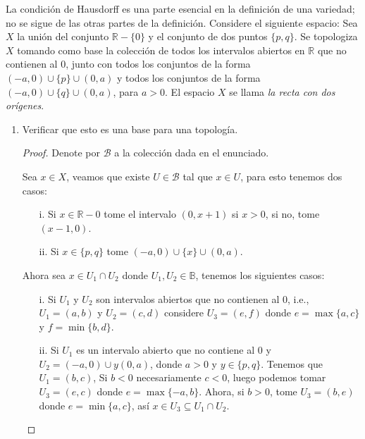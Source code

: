 
\item La condición de Hausdorff es una parte esencial en la definición de una variedad; no se sigue de las otras partes de la definición. Considere el siguiente espacio:  
    Sea \( X \) la unión del conjunto \( \mathbb{R} - \{ 0 \} \) y el conjunto de dos puntos \( \{ p, q \} \). Se topologiza \( X \) tomando como base la colección de todos los intervalos abiertos en \( \mathbb{R} \) que no contienen al \( 0 \), junto con todos los conjuntos de la forma \( (-a,0) \cup \{ p \} \cup (0,a) \) y todos los conjuntos de la forma \( (-a,0) \cup \{ q \} \cup (0,a) \), para \( a > 0 \). El espacio \( X \) se llama \textit{la recta con dos orígenes}.
    
    \begin{enumerate}
        \item Verificar que esto es una base para una topología.

        \begin{proof}
            Denote por $\mathcal{B}$ a la colección dada en el enunciado.

            Sea $x \in X$, veamos que existe $U \in \mathcal{B}$ tal que $x \in U$, para esto tenemos dos casos:

            \begin{itemize}
                \item[i.]
                Si $x \in \mathbb{R}-{0}$ tome el intervalo $(0,x+1)$ si $x>0$, si no, tome $(x-1,0)$.
                \item[ii.]
                Si $x \in \{p,q\}$ tome $(-a,0) \cup \{x\} \cup (0,a)$. 
            \end{itemize}

            Ahora sea $x \in U_1 \cap U_2$ donde $U_1,U_2 \in \mathbb{B}$, tenemos los siguientes casos:

            \begin{itemize}
                \item[i.]
                 Si $U_1$ y $U_2$ son intervalos abiertos que no contienen al 0, i.e., $U_1 = (a,b)$ y $U_2 = (c,d)$  considere $U_3=(e,f)$ donde $e=\max\{a,c\}$ y $f=\min\{b,d\}$.

                \item[ii.]
                  Si $U_1$ es un intervalo abierto que no contiene al 0 y $U_2= (-a,0) \cup {y} (0,a)$, donde $a>0$ y $y \in \{p,q\}$. Tenemos que $U_1 = (b,c)$, Si $b<0$ necesariamente $c<0$, luego podemos tomar $U_3 = (e,c)$ donde $e=\max\{-a,b\}$. Ahora, si $b>0$, tome $U_3 = (b,e)$ donde $e=\min\{a,c\}$, así $x \in U_3 \subseteq U_1 \cap U_2$.


\end{itemize}
\end{proof}
\end{enumerate}
